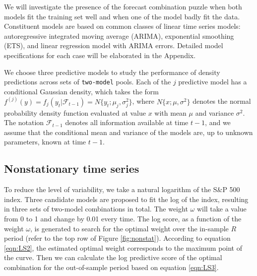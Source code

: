 \documentclass{monashthesis}
\begin{document}
We will investigate the presence of the forecast combination puzzle when both models fit the training set well and when one of the model badly fit the data. Constituent models are based on common classes of linear time series models: autoregressive integrated moving average (ARIMA), exponential smoothing (ETS), and linear regression model with ARIMA errors. Detailed model specifications for each case will be elaborated in the Appendix.

We choose three predictive models to study the performance of density predictions across sets of \texttt{two-model} pools. Each of the \(j\) predictive model has a conditional Gaussian density, which takes the form \(f^{(j)}(y)=f_j(y_t|\mathcal{F}_{t-1})=N\{y_t; \mu_j, \sigma^2_j\}\), where \(N\{x; \mu, \sigma^2\}\) denotes the normal probability density function evaluated at value \(x\) with mean \(\mu\) and variance \(\sigma^2\). The notation \(\mathcal{F}_{t-1}\) denotes all information available at time \(t-1\), and we assume that the conditional mean and variance of the models are, up to unknown parameters, known at time \(t-1\).

\hypertarget{nonstationary-time-series}{%
\subsection{Nonstationary time series}\label{nonstationary-time-series}}

To reduce the level of variability, we take a natural logarithm of the S\&P 500 index. Three candidate models are proposed to fit the log of the index, resulting in three sets of two-model combinations in total. The weight \(\omega\) will take a value from 0 to 1 and change by 0.01 every time. The log score, as a function of the weight \(\omega\), is generated to search for the optimal weight over the in-sample \(R\) period (refer to the top row of Figure \ref{fig:nonstat}). According to equation \ref{eqn:LS2}, the estimated optimal weight corresponds to the maximum point of the curve. Then we can calculate the log predictive score of the optimal combination for the out-of-sample period based on equation \ref{eqn:LS3}.
\end{document}
